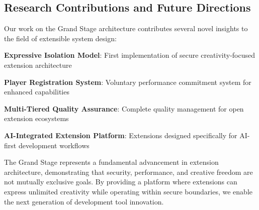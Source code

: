\subsection*{Research Contributions and Future Directions}

Our work on the Grand Stage architecture contributes several novel insights to the field of extensible system design:

\begin{expandedlist}
    \item \textbf{Expressive Isolation Model}: First implementation of secure creativity-focused extension architecture
    \item \textbf{Player Registration System}: Voluntary performance commitment system for enhanced capabilities
    \item \textbf{Multi-Tiered Quality Assurance}: Complete quality management for open extension ecosystems
    \item \textbf{AI-Integrated Extension Platform}: Extensions designed specifically for AI-first development workflows
\end{expandedlist}

The Grand Stage represents a fundamental advancement in extension architecture, demonstrating that security, performance, and creative freedom are not mutually exclusive goals. By providing a platform where extensions can express unlimited creativity while operating within secure boundaries, we enable the next generation of development tool innovation.
